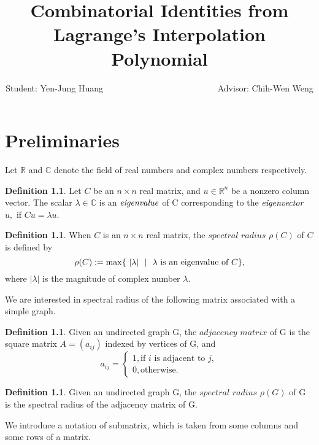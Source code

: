 \documentclass[12pt]{report}%
\title{Combinatorial Identities from Lagrange's Interpolation Polynomial}
\author{Student: Yen-Jung Huang  ~~~~~~~~~~~~~~~~~~~~~~~~~~Advisor: Chih-Wen Weng}
\date{} %
\theoremstyle{plain}
\theoremstyle{definition}
\newtheorem{defn}[thm]{Definition}
\begin{document}
\chapter{Preliminaries}

Let $\mathbb{R}$ and $\mathbb{C}$ denote the field of real numbers and complex numbers respectively.


\begin{defn}
    Let $C$ be an $n \times n$ real matrix, and $u \in \mathbb{R}^n$ be a nonzero column vector. The scalar $\lambda \in \mathbb{C}$ is an $\it{eigenvalue}$ of C corresponding to the $\it{eigenvector}$ $u,$  if $Cu = \lambda u.$
   
\end{defn}

\begin{defn}

When $C$ is an $n \times n$ real matrix, the $\textit {spectral radius} $ $\rho(C)$ of $C$ is defined by
$$\rho(C):=\max\{~|\lambda|~\ |~~\lambda\hbox{ is an eigenvalue of $C$}\},$$
where $|\lambda|$ is the magnitude of complex number $\lambda.$
\end{defn}

We are interested in spectral radius of the following matrix associated with a simple graph.

\begin{defn} Given an undirected graph
G, the$\textit{ adjacency matrix}$ of G is the square matrix $A = (a_{ij})$ indexed by vertices of G,
and
\[a_{ij} =\begin{cases}
1, \text{if $i$ is adjacent to $j$}, \\
0, \text{otherwise.}
\end{cases}
\]

\end{defn}

\begin{defn}
Given an undirected graph G, the $\textit{spectral radius}$  $\rho(G) $ of G is the spectral radius of the adjacency matrix of G.
\end{defn}



    We introduce a notation of submatrix, which is taken from some columns and some rows of a matrix.
\end{document}
